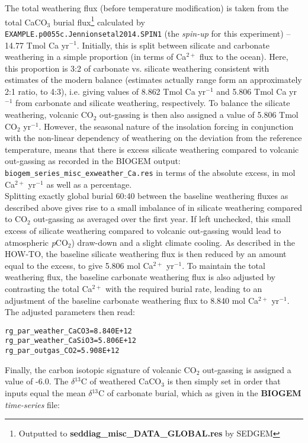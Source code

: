 \documentclass[10pt,twoside]{article}
\begin{document}
\begin{compactitem}
The total weathering flux (before temperature modification) is taken from the total CaCO$_{3}$ burial flux\footnote{Outputted to \textbf{seddiag\_misc\_DATA\_GLOBAL.res} by SEDGEM} calculated by \texttt{EXAMPLE.p0055c.Jennionsetal2014.SPIN1} (the \textit{spin-up} for this experiment) -- 14.77 Tmol Ca yr$^{-1}$.
Initially, this is split between silicate and carbonate weathering in a simple proportion (in terms of Ca$^{2+}$ flux to the ocean). Here, this proportion is 3:2 of carbonate vs. silicate weathering consistent with estimates of the modern balance (estimates actually range form an approximately 2:1 ratio, to 4:3), i.e. giving values of 8.862 Tmol Ca yr$^{-1}$ and 5.806 Tmol Ca yr$^{-1}$ from carbonate and silicate weathering, respectively. To balance the silicate weathering, volcanic CO$_{2}$ out-gassing is then also assigned a value of 5.806 Tmol CO$_{2}$ yr$^{-1}$.
However, the seasonal nature of the insolation forcing in conjunction with the non-linear dependency of weathering on the deviation from the reference temperature, means that there is excess silicate weathering compared to volcanic out-gassing as recorded in the BIOGEM output:
\texttt{biogem\_series\_misc\_exweather\_Ca.res}
in terms of the absolute excess, in mol Ca$^{2+}$ yr$^{-1}$ as well as a percentage.
\\ Splitting exactly global burial 60:40 between the baseline weathering fluxes as described above gives rise to a small imbalance of in silicate weathering compared to CO${_2}$ out-gassing as averaged over the first year. If left unchecked, this small excess of silicate weathering compared to volcanic out-gassing would lead to atmospheric \textit{p}CO${_2}$) draw-down and a slight climate cooling. As described in the HOW-TO, the baseline silicate weathering flux is then reduced by an amount equal to the excess, to give 5.806 mol Ca$^{2+}$ yr$^{-1}$. To maintain the total  weathering flux, the baseline carbonate weathering flux is also adjusted by contrasting the total Ca$^{2+}$ with the required burial rate, leading to an adjustment of the baseline carbonate weathering flux to 8.840 mol Ca$^{2+}$ yr$^{-1}$. The adjusted parameters then read:
\vspace{-5pt}\begin{verbatim}
rg_par_weather_CaCO3=8.840E+12
rg_par_weather_CaSiO3=5.806E+12
rg_par_outgas_CO2=5.908E+12
                \end{verbatim}\vspace{-5pt}
Finally, the carbon isotopic signature of volcanic CO$_{2}$ out-gassing is assigned a value of -6.0\permil. The $\delta$$^{13}$C of weathered CaCO$_{3}$ is then simply set in order that inputs equal the mean $\delta$$^{13}$C of carbonate burial, which as given in the \textbf{BIOGEM} \textit{time-series} file:

\end{compactitem}
\end{document}
